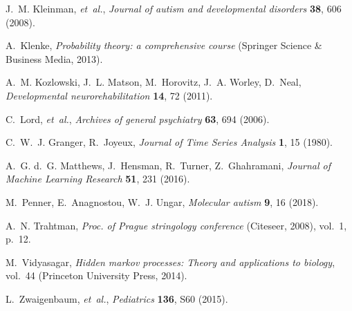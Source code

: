 \documentclass[onecolumn,,10pt]{IEEEtran}
\begin{document}
\begin{thebibliography}{10}
J.~M. Kleinman, {\it et~al.\/}, {\it Journal of autism and developmental
  disorders\/} {\bf 38}, 606 (2008).

A.~Klenke, {\it Probability theory: a comprehensive course\/} (Springer Science
  \& Business Media, 2013).

A.~M. Kozlowski, J.~L. Matson, M.~Horovitz, J.~A. Worley, D.~Neal, {\it
  Developmental neurorehabilitation\/} {\bf 14}, 72 (2011).

C.~Lord, {\it et~al.\/}, {\it Archives of general psychiatry\/} {\bf 63}, 694
  (2006).

C.~W.~J. Granger, R.~Joyeux, {\it Journal of Time Series Analysis\/} {\bf 1},
  15 (1980).

A.~G. d.~G. Matthews, J.~Hensman, R.~Turner, Z.~Ghahramani, {\it Journal of
  Machine Learning Research\/} {\bf 51}, 231 (2016).

M.~Penner, E.~Anagnostou, W.~J. Ungar, {\it Molecular autism\/} {\bf 9}, 16
  (2018).

A.~N. Trahtman, {\it Proc. of Prague stringology conference\/} (Citeseer,
  2008), vol.~1, p.~12.

M.~Vidyasagar, {\it Hidden markov processes: Theory and applications to
  biology\/}, vol.~44 (Princeton University Press, 2014).

L.~Zwaigenbaum, {\it et~al.\/}, {\it Pediatrics\/} {\bf 136}, S60 (2015).

\end{thebibliography}
\end{document}
